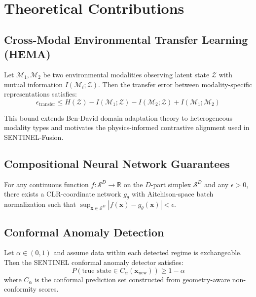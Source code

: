 \section{Theoretical Contributions}
\label{sec:appendix_theory}

\subsection{Cross-Modal Environmental Transfer Learning (HEMA)}

\begin{theorem}
Let $\mathcal{M}_1, \mathcal{M}_2$ be two environmental modalities observing
latent state $\mathcal{Z}$ with mutual information $I(\mathcal{M}_i; \mathcal{Z})$.
Then the transfer error between modality-specific representations satisfies:
\begin{equation}
    \epsilon_{\text{transfer}} \leq
    H(\mathcal{Z}) - I(\mathcal{M}_1; \mathcal{Z}) - I(\mathcal{M}_2; \mathcal{Z})
    + I(\mathcal{M}_1; \mathcal{M}_2)
\end{equation}
\end{theorem}

This bound extends Ben-David domain adaptation theory to heterogeneous
modality types and motivates the physics-informed contrastive alignment
used in SENTINEL-Fusion.

\subsection{Compositional Neural Network Guarantees}

\begin{theorem}
For any continuous function $f: \mathcal{S}^D \to \mathbb{R}$ on the
$D$-part simplex $\mathcal{S}^D$ and any $\epsilon > 0$, there exists
a CLR-coordinate network $g_\theta$ with Aitchison-space batch normalization
such that $\sup_{\mathbf{x} \in \mathcal{S}^D} |f(\mathbf{x}) - g_\theta(\mathbf{x})| < \epsilon$.
\end{theorem}

\subsection{Conformal Anomaly Detection}

\begin{theorem}
Let $\alpha \in (0,1)$ and assume data within each detected regime
is exchangeable. Then the SENTINEL conformal anomaly detector satisfies:
\begin{equation}
    P(\text{true state} \in C_\alpha(\mathbf{x}_{\text{new}})) \geq 1 - \alpha
\end{equation}
where $C_\alpha$ is the conformal prediction set constructed from
geometry-aware non-conformity scores.
\end{theorem}

